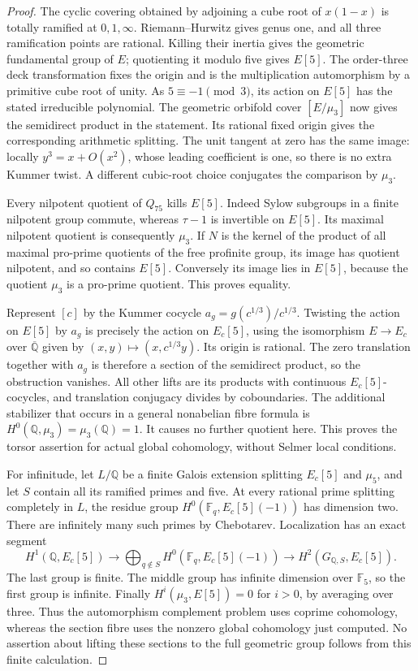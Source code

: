 \begin{proof}
The cyclic covering obtained by adjoining a cube root of
\(x(1-x)\) is totally ramified at \(0,1,\infty\).
Riemann--Hurwitz gives genus one, and all three ramification
points are rational. Killing their inertia gives the geometric
fundamental group of \(E\); quotienting it modulo five gives
\(E[5]\). The order-three deck transformation fixes the origin
and is the multiplication automorphism by a primitive cube
root of unity. As \(5\equiv-1\pmod3\), its action on \(E[5]\)
has the stated irreducible polynomial. The geometric orbifold
cover \([E/\mu_3]\) now gives the semidirect product in the
statement. Its rational fixed origin gives the corresponding
arithmetic splitting. The unit tangent at zero has the same
image: locally \(y^3=x+O(x^2)\), whose leading coefficient is
one, so there is no extra Kummer twist. A different cubic-root
choice conjugates the comparison by \(\mu_3\).

Every nilpotent quotient of \(Q_{75}\) kills \(E[5]\). Indeed
Sylow subgroups in a finite nilpotent group commute, whereas
\(\tau-1\) is invertible on \(E[5]\). Its maximal nilpotent
quotient is consequently \(\mu_3\). If \(N\) is the kernel of
the product of all maximal pro-prime quotients of the free
profinite group, its image has quotient nilpotent, and so
contains \(E[5]\). Conversely its image lies in \(E[5]\),
because the quotient \(\mu_3\) is a pro-prime quotient. This
proves equality.

Represent \([c]\) by the Kummer cocycle
\(a_g=g(c^{1/3})/c^{1/3}\). Twisting the action on \(E[5]\) by
\(a_g\) is precisely the action on \(E_c[5]\), using the
isomorphism \(E\to E_c\) over \(\overline{\mathbb Q}\) given
by \((x,y)\mapsto(x,c^{1/3}y)\). Its origin is rational.
The zero translation together with \(a_g\) is therefore a
section of the semidirect product, so the obstruction vanishes.
All other lifts are its products with continuous
\(E_c[5]\)-cocycles, and translation conjugacy divides by
coboundaries. The additional stabilizer that occurs in a
general nonabelian fibre formula is
\(H^0(\mathbb Q,\mu_3)=\mu_3(\mathbb Q)=1\). It causes no
further quotient here. This proves the torsor assertion for
actual global cohomology, without Selmer local conditions.

For infinitude, let \(L/\mathbb Q\) be a finite Galois
extension splitting \(E_c[5]\) and \(\mu_5\), and let \(S\)
contain all its ramified primes and five. At every rational
prime splitting completely in \(L\), the residue group
\(H^0(\mathbb F_q,E_c[5](-1))\) has dimension two.
There are infinitely many such primes by Chebotarev.
Localization has an exact segment
\[
H^1(\mathbb Q,E_c[5])\longrightarrow
\bigoplus_{q\notin S}H^0(\mathbb F_q,E_c[5](-1))
\longrightarrow H^2(G_{\mathbb Q,S},E_c[5]).
\]
The last group is finite. The middle group has infinite
dimension over \(\mathbb F_5\), so the first group is infinite.
Finally \(H^i(\mu_3,E[5])=0\) for \(i>0\), by averaging over
three. Thus the automorphism complement problem uses coprime
cohomology, whereas the section fibre uses the nonzero global
cohomology just computed. No assertion about lifting these
sections to the full geometric group follows from this finite
calculation.
\end{proof}


